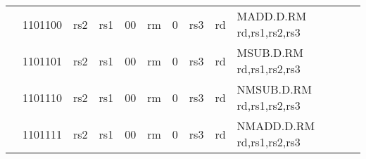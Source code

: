 \begin{table}[p]
\begin{small}
\begin{center}
\begin{tabular}{rcccccccccccl}
&
\multicolumn{2}{|c|}{1101100} &
\multicolumn{1}{c|}{rs2} &
\multicolumn{1}{c|}{rs1} &
\multicolumn{1}{c|}{00} &
\multicolumn{2}{c|}{rm} &
\multicolumn{1}{c|}{0} &
\multicolumn{2}{c|}{rs3} &
\multicolumn{1}{c|}{rd} & MADD.D.RM rd,rs1,rs2,rs3 \\
\cline{2-12}
  

&
\multicolumn{2}{|c|}{1101101} &
\multicolumn{1}{c|}{rs2} &
\multicolumn{1}{c|}{rs1} &
\multicolumn{1}{c|}{00} &
\multicolumn{2}{c|}{rm} &
\multicolumn{1}{c|}{0} &
\multicolumn{2}{c|}{rs3} &
\multicolumn{1}{c|}{rd} & MSUB.D.RM rd,rs1,rs2,rs3 \\
\cline{2-12}
  

&
\multicolumn{2}{|c|}{1101110} &
\multicolumn{1}{c|}{rs2} &
\multicolumn{1}{c|}{rs1} &
\multicolumn{1}{c|}{00} &
\multicolumn{2}{c|}{rm} &
\multicolumn{1}{c|}{0} &
\multicolumn{2}{c|}{rs3} &
\multicolumn{1}{c|}{rd} & NMSUB.D.RM rd,rs1,rs2,rs3 \\
\cline{2-12}
  

&
\multicolumn{2}{|c|}{1101111} &
\multicolumn{1}{c|}{rs2} &
\multicolumn{1}{c|}{rs1} &
\multicolumn{1}{c|}{00} &
\multicolumn{2}{c|}{rm} &
\multicolumn{1}{c|}{0} &
\multicolumn{2}{c|}{rs3} &
\multicolumn{1}{c|}{rd} & NMADD.D.RM rd,rs1,rs2,rs3 \\
\cline{2-12}
  

\end{tabular}
\end{center}
\end{small}

\label{instr-table}
\end{table}
  

\newpage

